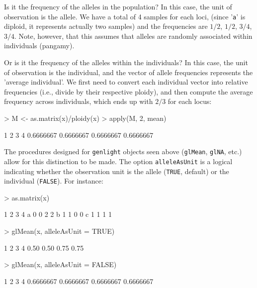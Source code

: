 \documentclass{article}
\begin{document}
Is it the frequency of the alleles in the population?
In this case, the unit of observation is the allele.
We have a total of 4 samples for each loci, (since '\texttt{a}' is diploid, it
represents actually two samples) and the frequencies are $1/2$, $1/2$, $3/4$, $3/4$.
Note, however, that this assumes that alleles are randomly associated within individuals (pangamy).

Or is it the frequency of the alleles within the individuals?
In this case, the unit of observation is the individual, and the vector of allele frequencies represents the 'average individual'.
We first need to convert each individual vector into relative frequencies (i.e., divide by their respective ploidy), and then compute the
average frequency across individuals, which ends up with $2/3$ for each locus:
\begin{Schunk}
\begin{Sinput}
> M <- as.matrix(x)/ploidy(x)
> apply(M, 2, mean)
\end{Sinput}
\begin{Soutput}
        1         2         3         4 
0.6666667 0.6666667 0.6666667 0.6666667 
\end{Soutput}
\end{Schunk}

The procedures designed for \texttt{genlight} objects seen above (\texttt{glMean}, \texttt{glNA},
etc.) allow for this distinction to be made.
The option \texttt{alleleAsUnit} is a logical indicating whether the observation unit is the allele
(\texttt{TRUE}, default) or the individual (\texttt{FALSE}).
For instance:
\begin{Schunk}
\begin{Sinput}
> as.matrix(x)
\end{Sinput}
\begin{Soutput}
  1 2 3 4
a 0 0 2 2
b 1 1 0 0
c 1 1 1 1
\end{Soutput}
\begin{Sinput}
> glMean(x, alleleAsUnit = TRUE)
\end{Sinput}
\begin{Soutput}
   1    2    3    4 
0.50 0.50 0.75 0.75 
\end{Soutput}
\begin{Sinput}
> glMean(x, alleleAsUnit = FALSE)
\end{Sinput}
\begin{Soutput}
        1         2         3         4 
0.6666667 0.6666667 0.6666667 0.6666667 
\end{Soutput}
\end{Schunk}
\end{document}
